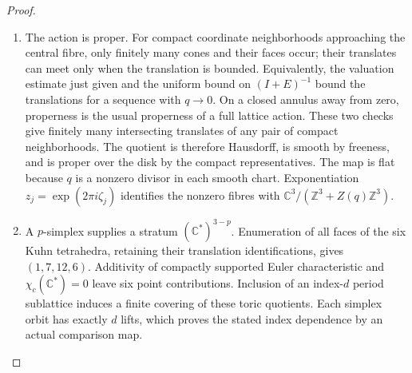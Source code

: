 \documentclass[11pt,a4paper]{article}
\theoremstyle{definition}
\begin{document}
\begin{proof}
\begin{enumerate}[label=\arabic*.]
\item The action is proper.  For compact coordinate neighborhoods approaching
the central fibre, only finitely many cones and their faces occur;
their translates can meet only when the translation is bounded.
Equivalently, the valuation estimate just given and the uniform bound
on $(I+E)^{-1}$ bound the translations for a sequence with $q\to0$.
On a closed annulus away from zero, properness is the usual
properness of a full lattice action.  These two checks give finitely
many intersecting translates of any pair of compact neighborhoods.
The quotient is therefore Hausdorff, is smooth by freeness, and is
proper over the disk by the compact representatives.  The map is flat
because $q$ is a nonzero divisor in each smooth chart.  Exponentiation
$z_j=\exp(2\pi i\zeta_j)$ identifies the nonzero fibres with
$\mathbb C^3/(\mathbb Z^3+Z(q)\mathbb Z^3)$.

\item A $p$-simplex supplies a stratum $(\mathbb C^*)^{3-p}$.
Enumeration of all faces of the six Kuhn tetrahedra, retaining their
translation identifications, gives $(1,7,12,6)$.
Additivity of compactly supported Euler characteristic and
$\chi_c(\mathbb C^*)=0$ leave six point contributions.
Inclusion of an index-$d$ period sublattice induces a finite covering
of these toric quotients.  Each simplex orbit has exactly $d$ lifts,
which proves the stated index dependence by an actual comparison map.

\end{enumerate}
\end{proof}
\end{document}
